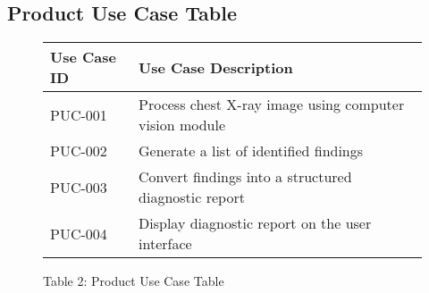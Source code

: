 \documentclass[12pt]{article}
\begin{document}
\subsection{Product Use Case Table}

\begin{figure}[H]
    \caption{Table 2: Product Use Case Table}
    \begin{tabularx}{\textwidth}{|X|X|}
    \hline
    Use Case ID & Use Case Description \\
    \hline
    PUC-001 & Process chest X-ray image using computer vision module \\
    \hline
    PUC-002 & Generate a list of identified findings \\
    \hline
    PUC-003 & Convert findings into a structured diagnostic report \\
    \hline
    PUC-004 & Display diagnostic report on the user interface \\
    \hline
    \end{tabularx}
\end{figure}
\end{document}

